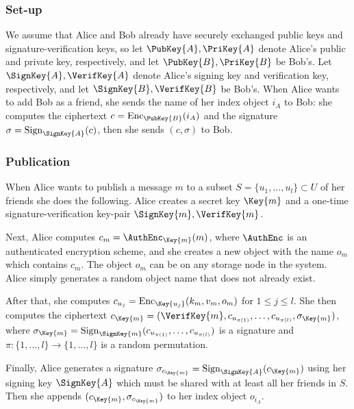 \subsubsection{Set-up}

We assume that Alice and Bob already have securely exchanged public keys and 
signature-verification keys,
so let \(\PubKey{A}, \PriKey{A}\) denote Alice's public and private key, 
respectively, and let \(\PubKey{B}, \PriKey{B}\) be Bob's.
Let \(\SignKey{A}, \VerifKey{A}\) denote Alice's signing key and verification 
key, respectively, and let \(\SignKey{B}, \VerifKey{B}\) be Bob's.
When Alice wants to add Bob as a friend, she sends the name of her index object 
\(i_A\) to Bob:
she computes the ciphertext \(c = \Enc_{\PubKey{B}}( i_A )\) and the signature 
\(\sigma = \Sign_{\SignKey{A}}( c )\), then she sends \((c, \sigma)\) to Bob.

\subsubsection{Publication}

When Alice wants to publish a message \(m\) to a subset \(S = \{u_1, \ldots, 
  u_l\}\subset U\) of her friends she does the following.
Alice creates a secret key \(\Key{m}\) and a one-time signature-verification 
key-pair \(\SignKey{m}, \VerifKey{m}\).

Next, Alice computes \(c_m = \AuthEnc_{\Key{m}}( m )\), where \(\AuthEnc\) is 
an authenticated encryption scheme, and she creates a new object with the name 
\(o_m\) which contains \(c_m\).
The object \(o_m\) can be on any storage node in the system.
Alice simply generates a random object name that does not already exist.

After that, she computes \(c_{u_j} = \Enc_{\Key{u_j}}( k_m, v_m, o_m )\) for 
\(1\leq j\leq l\).
She then computes the ciphertext \(c_{\Key{m}} = (\VerifKey{m}, c_{u_{\pi(1)}}, 
  \ldots, c_{u_{\pi(l)}}, \sigma_{\Key{m}})\), where \(\sigma_{\Key{m}} 
  = \Sign_{\SignKey{m}}( c_{u_{\pi(1)}}, \ldots, c_{u_{\pi(l)}} )\) is 
a signature and \(\pi\colon \{1,\ldots,l\}\to \{1,\ldots,l\}\) is a random 
permutation.

Finally, Alice generates a signature \(\sigma_{c_{\Key{m}}} 
  = \Sign_{\SignKey{A}}( c_{\Key{m}} )\) using her signing key \(\SignKey{A}\) 
which must be shared with at least all her friends in \(S\).
Then she appends \((c_{\Key{m}}, \sigma_{c_{\Key{m}}})\) to her index object 
\(o_{i_A}\).

